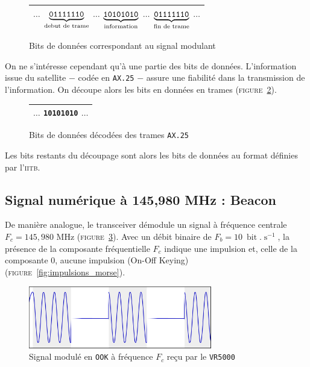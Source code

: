 \documentclass[twocolumn,pre,floats,aps,amsmath,amssymb]{revtex4}
\begin{document}
\begin{figure}[h]
  \begin{tabular}{|c|}
    \hline
    $\dots$
    \textcolor{rltred}{$\underbrace{\texttt{01111110}}_{\textup{debut de trame}}$}
    $\dots$
    \textcolor{rltgreen}{$\underbrace{\texttt{10101010}}_{\textup{information}}$}
    $\dots$
    \textcolor{rltred}{$\underbrace{\texttt{01111110}}_{\textup{fin de trame}}$}
    $\dots$\\
    \hline
  \end{tabular}
\caption{Bits de donn\'ees correspondant au signal modulant}
\label{fig:bits_donnees}
\end{figure}

On ne s'int\'eresse cependant qu'\`a une partie des bits de donn\'ees. L'information issue du satellite $-$ cod\'ee en \texttt{AX.25} $-$ assure une fiabilit\'e dans la transmission de l'information. On d\'ecoupe alors les bits en donn\'ees en trames (\textsc{figure}~\ref{fig:bits_sans_ax25}).

\begin{figure}[h]
  \begin{tabular}{|c|}
    \hline
    $\dots$ \textcolor{rltgreen}{\texttt{10101010}} $\dots$\\
    \hline
  \end{tabular}
  \caption{Bits de donn\'ees d\'ecod\'ees des trames \texttt{AX.25}}
  \label{fig:bits_sans_ax25}
\end{figure}

Les bits restants du d\'ecoupage sont alors les bits de donn\'ees au format d\'efinies par l'\textsc{iitb}\cite{IITB}.

\subsection{Signal num\'erique \`a 145,980 MHz : Beacon}

De mani\`ere analogue, le transceiver d\'emodule un signal \`a fr\'equence centrale $F_c = 145,980$ MHz (\textsc{figure}~\ref{fig:signal_ook}). Avec un d\'ebit binaire de $F_b = 10 \ \operatorname{bit}.\operatorname{s}^{-1}$, la pr\'esence de la composante fr\'equentielle $F_c$ indique une impulsion et, celle de la composante $0$, aucune impulsion (On-Off Keying) (\textsc{figure}~\ref{fig:impulsions_morse}).

\begin{figure}[h]
  \includegraphics[width=8cm]{pictures/sans_porteuse.png}
  \caption{Signal modul\'e en \texttt{OOK} \`a fr\'equence $F_c$ re\c{c}u par le \texttt{VR5000}}
  \label{fig:signal_ook}
\end{figure}
\end{document}
